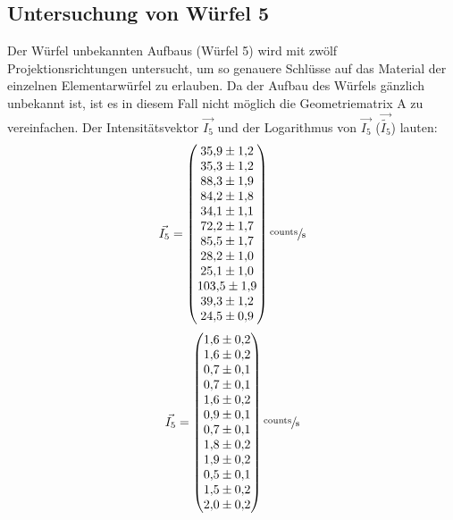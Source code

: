 \subsection{Untersuchung von Würfel 5}
Der Würfel unbekannten Aufbaus (Würfel 5) wird mit zwölf Projektionsrichtungen untersucht, um so genauere Schlüsse auf das Material der einzelnen Elementarwürfel zu erlauben. Da der Aufbau des Würfels
gänzlich unbekannt ist, ist es in diesem Fall nicht möglich die Geometriematrix A zu vereinfachen. Der Intensitätsvektor $\vec{I_5}$ und der Logarithmus von $\vec{I_5}$ ($\vec{\tilde{I_5}}$) lauten:
\begin{equation}
	\vec{I_5}=
	\begin{pmatrix}
		\num{35.9 \pm 1.2} \\
		\num{35.3 \pm 1.2} \\
		\num{88.3\pm 1.9} \\
		\num{84.2\pm 1.8} \\
		\num{34.1\pm 1.1} \\
		\num{72.2\pm 1.7} \\
		\num{85.5\pm 1.7} \\
		\num{28.2\pm 1.0} \\
		\num{25.1\pm 1.0} \\
    \num{103.5\pm 1.9} \\
    \num{39.3\pm 1.2} \\
    \num{24.5\pm 0.9} \\
	\end{pmatrix}
    \sfrac{\text{counts}}{\text{s}}
	\label{eq:vec5}
\end{equation}
\begin{equation}
	\vec{I_5}=
	\begin{pmatrix}
		\num{1.6 \pm 0.2} \\
		\num{1.6 \pm 0.2} \\
		\num{0.7\pm 0.1} \\
		\num{0.7\pm 0.1} \\
		\num{1.6\pm 0.2} \\
		\num{0.9\pm 0.1} \\
		\num{0.7\pm 0.1} \\
		\num{1.8\pm 0.2} \\
		\num{1.9\pm 0.2} \\
    \num{0.5\pm 0.1} \\
    \num{1.5\pm 0.2} \\
    \num{2.0\pm 0.2} \\
	\end{pmatrix}
    \sfrac{\text{counts}}{\text{s}}
	\label{eq:vecleer1}
\end{equation}
